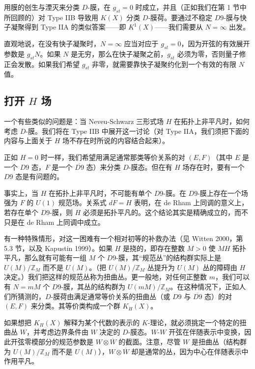用膜的创生与湮灭来分类 \(D\)-膜，在 \(g_{st}=0\) 时成立，并且（正如我们在第 1 节中所回顾的）对 Type IIB 导致用 \(K(X)\) 分类 \(D\)-膜荷。要通过不稳定 \(D9\)-膜与快子凝聚得到 Type IIA 的类似答案——即 \(K^1(X)\)——我们需要从 \(N=\infty\) 出发。

直观地说，在没有快子凝聚时，\(N=\infty\) 应当对应于 \(g_{st}=0\)，因为开弦的有效展开参数是 \(g_{st}N\)。如果 \(N\) 是无穷，那么在快子凝聚之前，\(g_{st}\) 必须为零，否则量子修正会发散。如果我们希望 \(g_{st}\) 非零，就需要靠快子凝聚约化到一个有效的有限 \(N\) 值。

\subsection{\texorpdfstring{打开 \(H\) 场}{打开 H 场}}

一个有些类似的问题是：当 Neveu-Schwarz 三形式场 \(H\) 在拓扑上非平凡时，如何考虑 \(D\)-膜。我们将在 Type IIB 中展开这一讨论（对 Type IIA，我们须把下面的内容与上面关于 \(H\) 场不存在时所说的内容结合起来）。

正如 \(H=0\) 时一样，我们希望用满足通常那类等价关系的对 \((E,F)\)（其中 \(E\) 是一个 \(D9\) 态，\(F\) 是一个 \(\overline{D9}\) 态）来分类 \(D\)-膜态。但在有 \(H\) 场存在时，要有一个 \(D9\) 态是有问题的。

事实上，当 \(H\) 在拓扑上非平凡时，不可能有单个 \(D9\)-膜。在 \(D9\)-膜上存在一个场强为 \(F\) 的 \(U(1)\) 规范场。关系式 \(dF=H\) 表明，在 de Rham 上同调的意义上，若存在单个 \(D9\)-膜，则 \(H\) 必须是拓扑平凡的。这个结论其实是精确成立的，而不只是在 de Rham 上同调中成立。

有一种特殊情形，对这一困难有一个相对初等的补救办法（见 Witten 2000，第 5.3 节，以及 Kapustin 1999）。如果 \(H\) 是挠的，即存在整数 \(M>0\) 使 \(MH\) 拓扑平凡，那么就有可能有一组 \(M\) 个 \(D9\)-膜，其“规范丛”的结构群实际上是 \(U(M)/\mathbb{Z}_M\) 而不是 \(U(M)\)。（把 \(U(M)/\mathbb{Z}_M\) 丛提升为 \(U(M)\) 丛的障碍由 \(H\) 决定。）我们把这样的规范丛称为扭曲丛。更一般地，对任何正整数 \(m\)，我们可以有 \(N=mM\) 个 \(D9\)-膜，其丛的结构群为 \(U(mM)/\mathbb{Z}_M\)。在这种情况下，正如人们所猜测的，\(D\)-膜荷由满足通常等价关系的扭曲丛（或 \(D9\) 与 \(\overline{D9}\) 态）的对 \((E,F)\) 来分类。其等价类构成一个群 \(K_H(X)\)。

如果想把 \(K_H(X)\) 解释为某个代数的表示的 \(K\)-理论，就必须挑定一个特定的扭曲丛 \(W\)，并考虑边界条件由 \(W\) 决定的 \(D\)-膜态。\(W\)-\(W\) 开弦在伴随表示中变换，因此开弦零模部分的规范参数是 \(W\otimes \overline W\) 的截面。注意，尽管 \(W\) 是扭曲丛（结构群为 \(U(M)/\mathbb{Z}_M\) 而不是 \(U(M)\)），\(W\otimes \overline W\) 却是通常的丛，因为中心在伴随表示中作用平凡。

